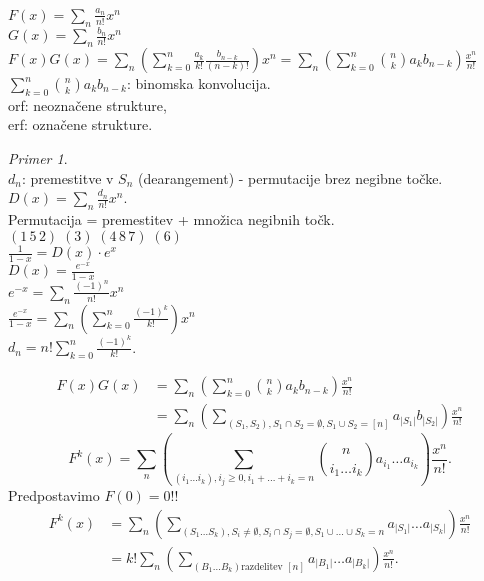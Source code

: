 \documentclass[a4paper, 12pt]{book}
\theoremstyle{definition}
\theoremstyle{remark}
\newtheorem*{ex}{Primer}
\begin{document}
$F(x) = \sum_n \frac{a_n}{n!} x^n$ \\
$G(x) = \sum_n \frac{b_n}{n!} x^n$ \\
$F(x) G(x) = \sum_n \left(\sum_{k=0}^{n} \frac{a_k}{k!} \frac{b_{n-k}}{(n-k)!}\right) x^n =
\sum_n \left(\sum_{k=0}^{n} \binom{n}{k} a_k b_{n-k}\right) \frac{x^n}{n!}$ \\
$\sum_{k=0}^{n} \binom{n}{k} a_k b_{n-k}$: binomska konvolucija. \\
orf: neoznačene strukture, \\
erf: označene strukture.
\begin{ex} \text{} \\
  $d_n$: premestitve v $S_n$ (dearangement) - permutacije brez negibne točke. \\
  $D(x) = \sum_n \frac{d_n}{n!} x^n$. \\
  Permutacija = premestitev + množica negibnih točk. \\
  $(1 \, 5 \, 2) \; (3) \; (4 \, 8 \, 7) \; (6)$ \\
  $\frac{1}{1-x} = D(x) \cdot e^x$ \\
  $D(x) = \frac{e^{-x}}{1-x}$ \\
  $e^{-x} = \sum_n \frac{(-1)^n}{n!} x^n$ \\
  $\frac{e^{-x}}{1-x} = \sum_n \left(\sum_{k=0}^{n} \frac{(-1)^k}{k!}\right) x^n$ \\
  $d_n = n! \sum_{k=0}^{n} \frac{(-1)^k}{k!}$.
\end{ex}
\begin{align*}
  F(x) G(x) &= \sum_{n} \left(\sum_{k=0}^{n} \binom{n}{k} a_k b_{n-k}\right) \frac{x^n}{n!} \\
  &= \sum_n \left(
    \sum_{(S_1,S_2), S_1 \cap S_2 = \emptyset, S_1 \cup S_2 = [n]} a_{|S_1|} b_{|S_2|} 
    \right) \frac{x^n}{n!}
\end{align*}
\begin{equation*}
  F^k(x) = \sum_n \left(
    \sum_{(i_1 \dots i_k), i_j \geq 0, i_1 + \dots + i_k = n}
    \binom{n}{i_1 \dots i_k} a_{i_1} \dots a_{i_k}
    \right) \frac{x^n}{n!}.
\end{equation*}
Predpostavimo $F(0) = 0$!!
\begin{align*}
  F^k(x) &= \sum_n \left(
    \sum_{(S_1 \dots S_k), S_i \neq \emptyset, S_i \cap S_j = \emptyset, S_1 \cup \dots \cup S_k = n}
    a_{|S_1|} \dots a_{|S_k|}
    \right) \frac{x^n}{n!} \\
  &= k! \sum_n \left(
    \sum_{(B_1 \dots B_k) \text{razdelitev } [n]}
    a_{|B_1|} \dots a_{|B_k|}
    \right) \frac{x^n}{n!}.
\end{align*}
\end{document}
